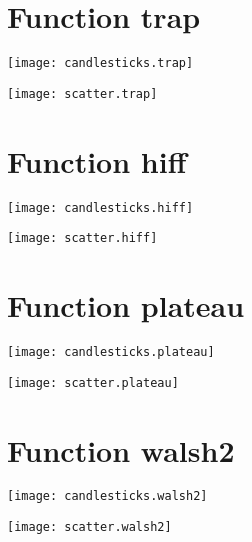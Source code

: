 \section{Function trap}
\begin{center}

\end{center}
\begin{center}

\end{center}
\begin{center}
\texttt{[image: candlesticks.trap]}
\end{center}
\begin{center}
\texttt{[image: scatter.trap]}
\end{center}
\newpage
\section{Function hiff}
\begin{center}

\end{center}
\begin{center}

\end{center}
\begin{center}
\texttt{[image: candlesticks.hiff]}
\end{center}
\begin{center}
\texttt{[image: scatter.hiff]}
\end{center}
\newpage
\section{Function plateau}
\begin{center}

\end{center}
\begin{center}

\end{center}
\begin{center}
\texttt{[image: candlesticks.plateau]}
\end{center}
\begin{center}
\texttt{[image: scatter.plateau]}
\end{center}
\newpage
\section{Function walsh2}
\begin{center}

\end{center}
\begin{center}

\end{center}
\begin{center}
\texttt{[image: candlesticks.walsh2]}
\end{center}
\begin{center}
\texttt{[image: scatter.walsh2]}
\end{center}
